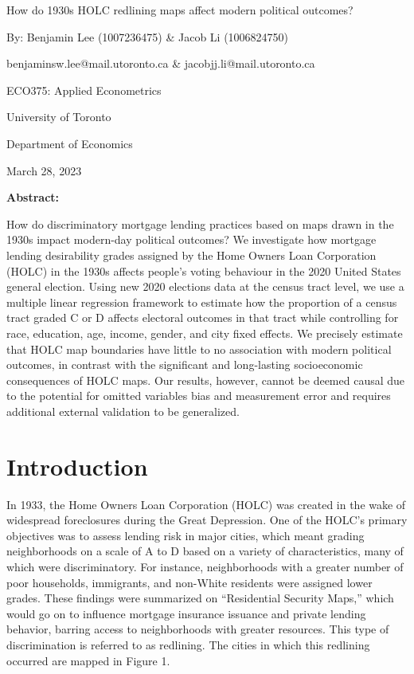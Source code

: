 \documentclass{eco_375_paper}
\begin{document}
\vspace*{\fill}
\begin{center}
	How do 1930s HOLC redlining maps affect modern political outcomes?
	
	By: Benjamin Lee (1007236475) \& Jacob Li (1006824750)
	
	benjaminsw.lee@mail.utoronto.ca \& jacobjj.li@mail.utoronto.ca
	\bigskip
	
	ECO375: Applied Econometrics 
	
	University of Toronto
	
	Department of Economics
	
	March 28, 2023
	
	\bigskip
	\textbf{Abstract: }
	
	How do discriminatory mortgage lending practices based on maps drawn in the 1930s impact modern-day political outcomes? We investigate how mortgage lending desirability grades assigned by the Home Owners Loan Corporation (HOLC) in the 1930s affects people’s voting behaviour in the 2020 United States general election. Using new 2020 elections data at the census tract level, we use a multiple linear regression framework to estimate how the proportion of a census tract graded C or D affects electoral outcomes in that tract while controlling for race, education, age, income, gender, and city fixed effects. We precisely estimate that HOLC map boundaries have little to no association with modern political outcomes, in contrast with the significant and long-lasting socioeconomic consequences of HOLC maps. Our results, however, cannot be deemed causal due to the potential for omitted variables bias and measurement error and requires additional external validation to be generalized.
\end{center}
\vspace*{\fill}
\pagebreak

\section*{Introduction}
In 1933, the Home Owners Loan Corporation (HOLC) was created in the wake of widespread foreclosures during the Great Depression. One of the HOLC’s primary objectives was to assess lending risk in major cities, which meant grading neighborhoods on a scale of A to D based on a variety of characteristics, many of which were discriminatory. For instance, neighborhoods with a greater number of poor households, immigrants, and non-White residents were assigned lower grades. These findings were summarized on “Residential Security Maps,” which would go on to influence mortgage insurance issuance and private lending behavior, barring access to neighborhoods with greater resources. This type of discrimination is referred to as redlining. The cities in which this redlining occurred are mapped in Figure 1.
\end{document}
